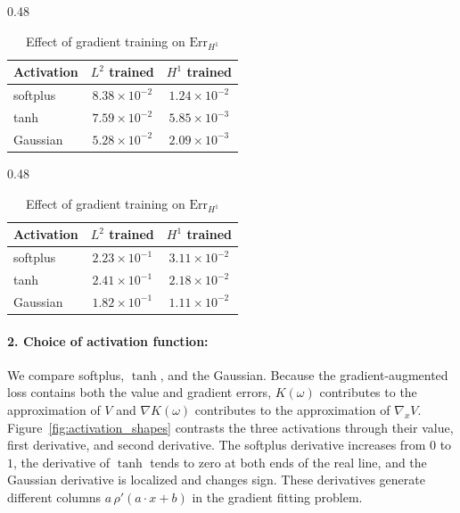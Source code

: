 \documentclass[11pt]{amsart}
\theoremstyle{definition}
\theoremstyle{remark}
\begin{document}
\begin{table}[htbp]
\centering
\caption{Effect of gradient-augmented fitting with
$\alpha=10^{-4}$, $\gamma=10$, $p=2.01$.}
\label{tab:alg1_gradient}
\begin{subtable}{0.48\textwidth}
\centering
\setlength{\tabcolsep}{9pt}
\renewcommand{\arraystretch}{1.25}
\begin{tabular}{lcc}
\toprule
Activation & $L^2$ trained & $H^1$ trained \\
\midrule
softplus & $8.38 \times 10^{-2}$ & $1.24 \times 10^{-2}$ \\
tanh & $7.59 \times 10^{-2}$ & $5.85 \times 10^{-3}$ \\
Gaussian & $5.28 \times 10^{-2}$ & $2.09 \times 10^{-3}$ \\
\bottomrule
\end{tabular}
\caption{Effect of gradient training on $\mathrm{Err}_{L^2}$ }
\label{tab:alg1_gradient_errl2}
\end{subtable}
\hfill
\begin{subtable}{0.48\textwidth}
\centering
\setlength{\tabcolsep}{9pt}
\renewcommand{\arraystretch}{1.25}
\begin{tabular}{lcc}
\toprule
Activation & $L^2$ trained & $H^1$ trained \\
\midrule
softplus & $2.23 \times 10^{-1}$ & $3.11 \times 10^{-2}$ \\
tanh & $2.41 \times 10^{-1}$ & $2.18 \times 10^{-2}$ \\
Gaussian & $1.82 \times 10^{-1}$ & $1.11 \times 10^{-2}$ \\
\bottomrule
\end{tabular}
\caption{Effect of gradient training on $\mathrm{Err}_{H^1}$}
\label{tab:alg1_gradient_errh1}
\end{subtable}
\end{table}

\paragraph{\textbf{2. Choice of activation function:}}
We compare softplus, $\tanh$, and the Gaussian. Because the
gradient-augmented loss contains both the value and gradient errors,
$K(\omega)$ contributes to the approximation of $V$ and
$\nabla K(\omega)$ contributes to the approximation of $\nabla_x V$.
Figure~\ref{fig:activation_shapes} contrasts the three activations through
their value, first derivative, and second derivative.
The softplus derivative increases from $0$ to $1$, the derivative of $\tanh$
tends to zero at both ends of the real line, and the Gaussian derivative is
localized and changes sign. These derivatives generate different columns
$a\,\rho'(a\cdot x+b)$ in the gradient fitting problem.
\end{document}
